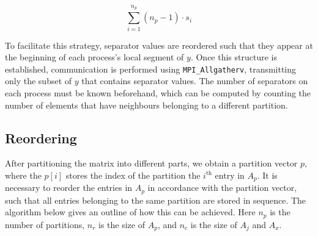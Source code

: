 \begin{equation}
    \label{eq:1bcomm}
    \sum_{i=1}^{n_{p}}(n_{p} - 1) \cdot s_{i} 
\end{equation}

To facilitate this strategy, separator values are reordered such that they appear at the beginning of each process's local segment of \(y\). Once this structure is established, communication is performed using \texttt{MPI\_Allgatherv}, transmitting only the subset of \(y\) that contains separator values. The number of separators on each process must be known beforehand, which can be computed by counting the number of elements that have neighbours belonging to a different partition.

\subsection{Reordering}
After partitioning the matrix into different parts, we obtain a partition vector \(p\), where the \(p[i]\) stores the index of the partition the \(i^{\text{th}}\) entry in \(A_{p}\). It is necessary to reorder the entries in \(A_{p}\) in accordance with the partition vector, such that all entries belonging to the same partition are stored in sequence. The algorithm below gives an outline of how this can be achieved. Here \(n_{p}\) is the number of partitions, \(n_{r}\) is the size of \(A_{p}\), and \(n_{c}\) is the size of \(A_{j}\) and \(A_{x}\).

